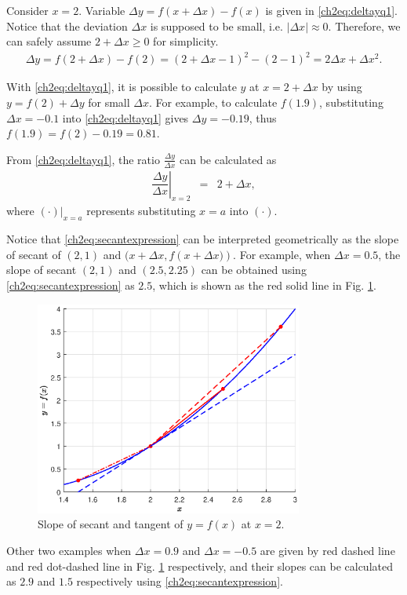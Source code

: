 Consider $x=2$. Variable $\Delta y = f\left(x+\Delta x\right) - f(x)$ is given in \eqref{ch2eq:deltayq1}. Notice that the deviation $\Delta x$ is supposed to be small, i.e. $|\Delta x| \approx 0$. Therefore, we can safely assume $2 + \Delta x \geq 0$ for simplicity.
\begin{eqnarray}
  \Delta y = f\left(2+\Delta x\right) - f(2)
  = \left(2 + \Delta x - 1\right)^2 - (2 - 1)^2
  = 2\Delta x + \Delta x^2. \label{ch2eq:deltayq1}
\end{eqnarray}

With \eqref{ch2eq:deltayq1}, it is possible to calculate $y$ at $x = 2 + \Delta x$ by using $y = f(2) + \Delta y$ for small $\Delta x$. For example, to calculate $f(1.9)$, substituting $\Delta x = -0.1$ into \eqref{ch2eq:deltayq1} gives $\Delta y = -0.19$, thus $f(1.9) = f(2) - 0.19 = 0.81$.

From \eqref{ch2eq:deltayq1}, the ratio $\frac{\Delta y}{\Delta x}$ can be calculated as
\begin{eqnarray}
  \left.\dfrac{\Delta y}{\Delta x}\right|_{x=2} &=& 2 + \Delta x, \label{ch2eq:secantexpression}
\end{eqnarray}
where $(\cdot)|_{x=a}$ represents substituting $x=a$ into $(\cdot)$.

Notice that \eqref{ch2eq:secantexpression} can be interpreted geometrically as the slope of secant of $(2,1)$ and $(x+\Delta x, f\left(x+\Delta x)\right)$. For example, when $\Delta x = 0.5$, the slope of secant $(2,1)$ and $(2.5,2.25)$ can be obtained using \eqref{ch2eq:secantexpression} as $2.5$, which is shown as the red solid line in Fig. \ref{ch2fig:simpleexptangent}.
\begin{figure}
\centering
\includegraphics[width=250pt]{chapters/part-1/figures/fig_simpleexp_tangent.eps}
\caption{Slope of secant and tangent of $y=f(x)$ at $x=2$.} \label{ch2fig:simpleexptangent}
\end{figure}
Other two examples when $\Delta x= 0.9$ and $\Delta x = -0.5$ are given by red dashed line and red dot-dashed line in Fig. \ref{ch2fig:simpleexptangent} respectively, and their slopes can be calculated as $2.9$ and $1.5$ respectively using \eqref{ch2eq:secantexpression}.

